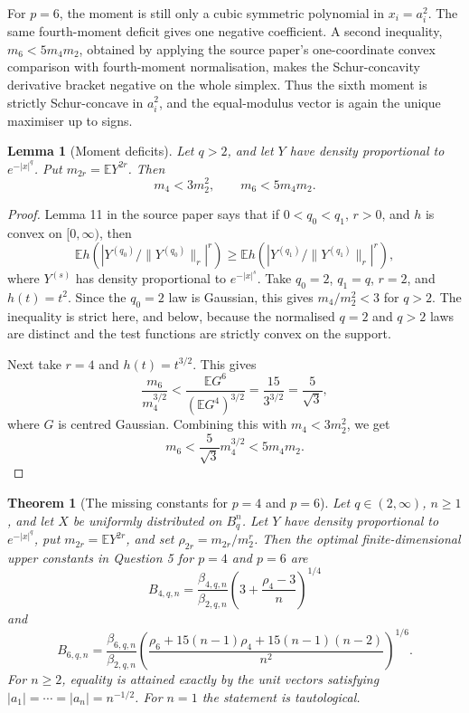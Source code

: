 \documentclass[11pt]{article}
\newtheorem{theorem}{Theorem}
\newtheorem{lemma}{Lemma}
\newcommand{\E}{\mathbb E}
\begin{document}
For \(p=6\), the moment is still only a cubic symmetric polynomial in \(x_i=a_i^2\).  The same fourth-moment deficit gives one negative coefficient.  A second inequality, \(m_6<5m_4m_2\), obtained by applying the source paper's one-coordinate convex comparison with fourth-moment normalisation, makes the Schur-concavity derivative bracket negative on the whole simplex.  Thus the sixth moment is strictly Schur-concave in \(a_i^2\), and the equal-modulus vector is again the unique maximiser up to signs.

\begin{lemma}[Moment deficits]\label{lem:deficits}
Let \(q>2\), and let \(Y\) have density proportional to \(e^{-|x|^q}\).  Put \(m_{2r}=\E Y^{2r}\).  Then
\[
m_4<3m_2^2,\qquad m_6<5m_4m_2.
\]
\end{lemma}

\begin{proof}
Lemma 11 in the source paper says that if \(0<q_0<q_1\), \(r>0\), and \(h\) is convex on \([0,\infty)\), then
\[
\E h\left(\left|Y^{(q_0)}/\|Y^{(q_0)}\|_r\right|^r\right)
\ge
\E h\left(\left|Y^{(q_1)}/\|Y^{(q_1)}\|_r\right|^r\right),
\]
where \(Y^{(s)}\) has density proportional to \(e^{-|x|^s}\).  Take \(q_0=2\), \(q_1=q\), \(r=2\), and \(h(t)=t^2\).  Since the \(q_0=2\) law is Gaussian, this gives \(m_4/m_2^2<3\) for \(q>2\).
The inequality is strict here, and below, because the normalised \(q=2\) and \(q>2\) laws are distinct and the test functions are strictly convex on the support.

Next take \(r=4\) and \(h(t)=t^{3/2}\).  This gives
\[
\frac{m_6}{m_4^{3/2}}
<
\frac{\E G^6}{(\E G^4)^{3/2}}
=\frac{15}{3^{3/2}}=\frac{5}{\sqrt3},
\]
where \(G\) is centred Gaussian.  Combining this with \(m_4<3m_2^2\), we get
\[
m_6<\frac{5}{\sqrt3}m_4^{3/2}<5m_4m_2.
\]
\end{proof}

\begin{theorem}[The missing constants for \(p=4\) and \(p=6\)]\label{thm:main}
Let \(q\in(2,\infty)\), \(n\ge1\), and let \(X\) be uniformly distributed on \(B_q^n\).  Let \(Y\) have density proportional to \(e^{-|x|^q}\), put \(m_{2r}=\E Y^{2r}\), and set \(\rho_{2r}=m_{2r}/m_2^r\).  Then the optimal finite-dimensional upper constants in Question 5 for \(p=4\) and \(p=6\) are
\[
B_{4,q,n}
=\frac{\beta_{4,q,n}}{\beta_{2,q,n}}
\left(3+\frac{\rho_4-3}{n}\right)^{1/4}
\]
and
\[
B_{6,q,n}
=\frac{\beta_{6,q,n}}{\beta_{2,q,n}}
\left(\frac{\rho_6+15(n-1)\rho_4+15(n-1)(n-2)}{n^2}\right)^{1/6}.
\]
For \(n\ge2\), equality is attained exactly by the unit vectors satisfying \(|a_1|=\cdots=|a_n|=n^{-1/2}\).  For \(n=1\) the statement is tautological.
\end{theorem}
\end{document}
